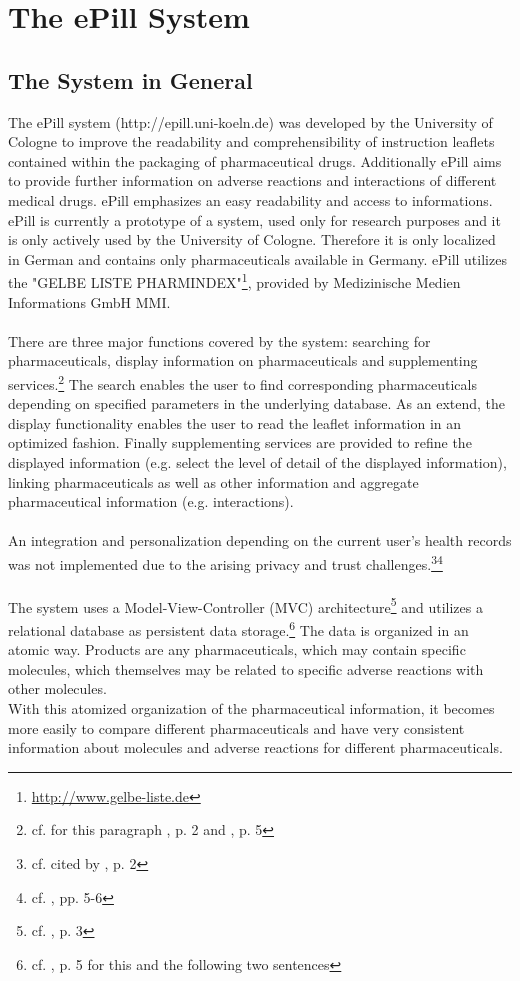 \section{The ePill System}
\subsection{The System in General}
The ePill system (http://epill.uni-koeln.de) was developed by the University of Cologne to improve the readability and comprehensibility of instruction leaflets contained within the packaging of pharmaceutical drugs. Additionally ePill aims to provide further information on adverse reactions and interactions of different medical drugs. ePill emphasizes an easy readability and access to informations.
\\
ePill is currently a prototype of a system, used only for research purposes and it is only actively used by the University of Cologne. Therefore it is only localized in German and contains only pharmaceuticals available in Germany. ePill utilizes the "GELBE LISTE PHARMINDEX"\footnote{\url{http://www.gelbe-liste.de}}, provided by Medizinische Medien Informations GmbH MMI.
\\
\\
There are three major functions covered by the system: searching for pharmaceuticals, display information on pharmaceuticals and supplementing services.\footnote{cf. for this paragraph \cite{Dehling.2012}, p. 2 and \cite{Dehling.2012b}, p. 5} The search enables the user to find corresponding pharmaceuticals depending on specified parameters in the underlying database. As an extend, the display functionality enables the user to read the leaflet information in an optimized fashion. Finally supplementing services are provided to refine the displayed information (e.g. select the level of detail of the displayed information), linking pharmaceuticals as well as other information and aggregate pharmaceutical information (e.g. interactions). 
\\
\\
An integration and personalization depending on the current user's health records was not implemented due to the arising privacy and trust challenges.\footnote{cf. \cite{Kaletsch.2011} cited by \cite{Dehling.2012}, p. 2}\footnote{cf. \cite{Kaletsch.2011}, pp. 5-6}
\\
\\
The system uses a Model-View-Controller (MVC) architecture\footnote{cf. \cite{Dehling.2012}, p. 3} and utilizes a relational database as persistent data storage.\footnote{cf. \cite{Dehling.2012}, p. 5 for this and the following two sentences} The data is organized in an atomic way. Products are any pharmaceuticals, which may contain specific molecules, which themselves may be related to specific adverse reactions with other molecules. 
\\
With this atomized organization of the pharmaceutical information, it becomes more easily to compare different pharmaceuticals and have very consistent information about molecules and adverse reactions for different pharmaceuticals.

